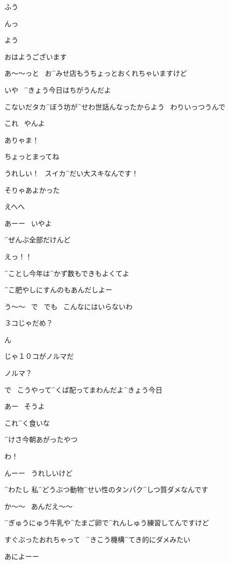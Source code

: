 \Alpha ふう

\page[67]
\Alpha んっ

\page[68]
\Ojisan よう

\Alpha おはようございます

\page[69]
\Alpha あ〜〜っと
\ お^{みせ}{店}もうちょっとおくれちゃいますけど

\Ojisan いや
\ ^{きょう}{今日}はちがうんだよ

\Ojisan こないだタカ^{ぼう}{坊}が^{せわ}{世話}んなったからよう
\ わりいっつうんで

\Ojisan これ
\ やんよ

\Alpha ありゃま！

\Alpha ちょっとまってね

\Alpha うれしい！
\ スイカ^{だい}{大}スキなんです！

\Ojisan そりゃあよかった

\page[70]
\Alpha えへへ

\Ojisan あーー
\ いやよ

\Ojisan ^{ぜんぶ}{全部}だけんど

\Alpha えっ！！

\Ojisan ^{ことし}{今年}は^{かず}{数}もできもよくてよ

\Ojisan ^{こ}{肥}やしにすんのもあんだしよー

\Alpha う〜〜
\ で
\ でも
\ こんなにはいらないわ

\Alpha ３コじゃだめ？

\page[71]
\Ojisan ん

\Ojisan じゃ１０コがノルマだ

\Alpha ノルマ？

\Ojisan で
\ こうやって^{くば}{配}ってまわんだよ^{きょう}{今日}

\Ojisan あー
\ そうよ

\page[72]
\Ojisan これ^{く}{食}いな

\Ojisan ^{けさ}{今朝}あがったやつ

\Alpha わ！

\Alpha んーー
\ うれしいけど

\Alpha ^{わたし }{私}^{どうぶつ}{動物}^{せい}{性}のタンパク^{しつ}{質}ダメなんです

\Ojisan か〜〜
\ あんだえ〜〜

\Alpha ^{ぎゅうにゅう}{牛乳}や^{たまご}{卵}で^{れんしゅう}{練習}してんですけど

\Alpha すぐぶったおれちゃって
\ ^{きこう}{機構}^{てき}{的}にダメみたい

\page[73]
\Ojisan あによーー

